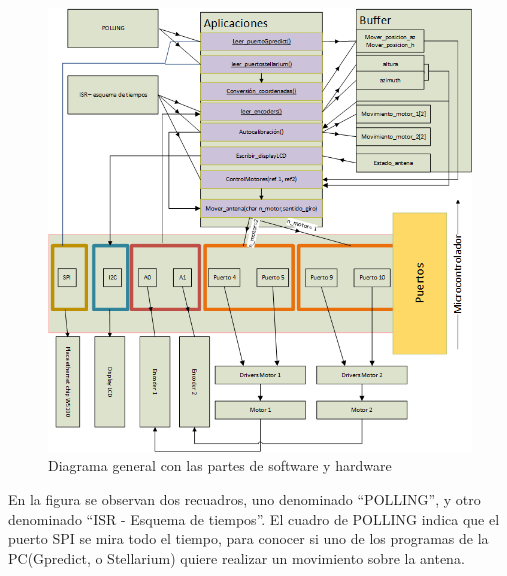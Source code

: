 \begin{figure}[ht!]
	\raggedleft
	\includegraphics[width=\linewidth]{software_diagrama_general}
	\caption{Diagrama general con las partes de software y hardware}
	\label{fig:software_diagrama_general}
\end{figure}

En la figura se observan dos recuadros, uno denominado ``POLLING'', y otro denominado ``ISR - Esquema de tiempos''. El cuadro de POLLING indica que el puerto SPI se mira todo el tiempo, para conocer si uno de los programas de la PC(Gpredict, o Stellarium) quiere realizar un movimiento sobre la antena. 




